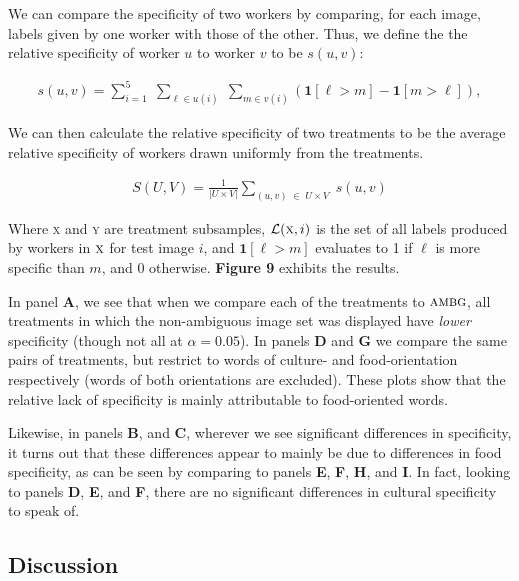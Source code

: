 \documentclass[a4paper]{report}
\begin{document}
We can compare the specificity of two workers by comparing, for each image,
labels given by one worker with those of the other.  Thus, we define the the
relative specificity of worker $u$ to worker $v$ to be $s(u,v)$:

\begin{align}
	s(u,v) = \sum_{i=1}^5 \;
	\sum_{\ell \in u(i) } \;
	\sum_{m \in v(i)} 
	\left(\mathbf{1}[\ell > m] - \mathbf{1}[m>\ell]\right),
	\label{eq:worker-specificity}
\end{align}

We can then calculate the relative specificity of two treatments to be the
average relative specificity of workers drawn uniformly from the treatments.

\begin{align}
	S(U,V) = 
		\frac{1}{|U \times V|}
		\sum_{(u,v) \; \in \; U \times V} \;
		s(u,v)
		\label{eq:specificity}
\end{align}

Where \textsc{x} and \textsc{y} are treatment subsamples,
$\mathcal{L}(\textsc{x},i)$ is the set of all labels produced by workers in 
$\textsc{x}$ for test image $i$, and $\mathbf{1}[\ell > m]$ evaluates to 1 if 
$\ell$ is more specific than $m$, and 0 otherwise.  \textbf{Figure 9} 
exhibits the results.

In panel \textbf{A}, we see that when we compare each of the treatments to
$\textsc{ambg}$, all treatments in which the non-ambiguous image set was 
displayed have \textit{lower} specificity (though not all at $\alpha=0.05$).  
In panels \textbf{D} and \textbf{G} we compare the same pairs of treatments, 
but restrict to words of culture- and food-orientation respectively (words
of both orientations are excluded).  These plots show that the relative lack of specificity is mainly attributable to food-oriented words.  

Likewise, in panels \textbf{B}, and \textbf{C}, 
wherever we see significant differences in specificity, it turns out that
these differences appear to mainly be due to differences in food specificity,
as can be seen by comparing to panels \textbf{E}, \textbf{F}, \textbf{H}, and 
\textbf{I}.  In fact, looking to panels \textbf{D}, \textbf{E}, and \textbf{F},
there are no significant differences in cultural specificity to speak of. 

\subsection*{Discussion}
\end{document}
